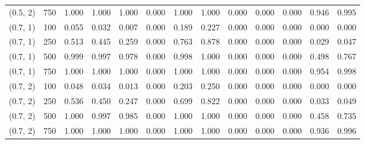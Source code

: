 \begin{table}[ht]
{\begin{tabular}{ll|ccccccccccc}
			(0.5, 2) & 750 & 1.000 & 1.000 & 1.000 & 0.000 & 1.000 & 1.000 & 0.000 & 0.000 & 0.000 & 0.946 & 0.995 \\
			(0.7, 1) & 100 & 0.055 & 0.032 & 0.007 & 0.000 & 0.189 & 0.227 & 0.000 & 0.000 & 0.000 & 0.000 & 0.000 \\
			(0.7, 1) & 250 & 0.513 & 0.445 & 0.259 & 0.000 & 0.763 & 0.878 & 0.000 & 0.000 & 0.000 & 0.029 & 0.047 \\
			(0.7, 1) & 500 & 0.999 & 0.997 & 0.978 & 0.000 & 0.998 & 1.000 & 0.000 & 0.000 & 0.000 & 0.498 & 0.767 \\
			(0.7, 1) & 750 & 1.000 & 1.000 & 1.000 & 0.000 & 1.000 & 1.000 & 0.000 & 0.000 & 0.000 & 0.954 & 0.998 \\
			(0.7, 2) & 100 & 0.048 & 0.034 & 0.013 & 0.000 & 0.203 & 0.250 & 0.000 & 0.000 & 0.000 & 0.000 & 0.000 \\
			(0.7, 2) & 250 & 0.536 & 0.450 & 0.247 & 0.000 & 0.699 & 0.822 & 0.000 & 0.000 & 0.000 & 0.033 & 0.049 \\
			(0.7, 2) & 500 & 1.000 & 0.997 & 0.985 & 0.000 & 1.000 & 1.000 & 0.000 & 0.000 & 0.000 & 0.458 & 0.735 \\
			(0.7, 2) & 750 & 1.000 & 1.000 & 1.000 & 0.000 & 1.000 & 1.000 & 0.000 & 0.000 & 0.000 & 0.936 & 0.996 \\
			\hline
		\end{tabular}
		
	}
\end{table}





